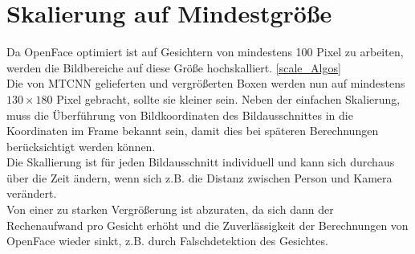 \section{Skalierung auf Mindestgröße}
\label{skalierung}
Da OpenFace optimiert ist auf Gesichtern von mindestens 100 Pixel zu arbeiten, werden die Bildbereiche auf diese Größe hochskalliert. \autoref{scale_Algos}\\
Die von MTCNN gelieferten und vergrößerten Boxen werden nun auf mindestens $130 \times 180$ Pixel gebracht, sollte sie kleiner sein.  Neben der einfachen Skalierung, muss die Überführung von Bildkoordinaten des Bildausschnittes in die Koordinaten im Frame bekannt sein, damit dies bei späteren Berechnungen berücksichtigt werden können.\\
Die Skallierung ist für jeden Bildausschnitt individuell und kann sich durchaus über die Zeit ändern, wenn sich z.B. die Distanz zwischen Person und Kamera verändert.\\
Von einer zu starken Vergrößerung ist abzuraten, da sich dann der Rechenaufwand pro Gesicht erhöht und die Zuverlässigkeit der Berechnungen von OpenFace wieder sinkt, z.B. durch Falschdetektion des Gesichtes.